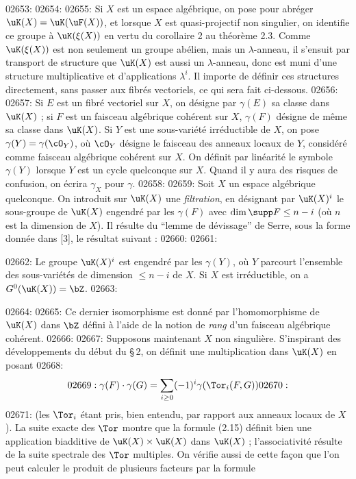 02653: %
02654: 
02655: Si $X$ est un espace alg\'ebrique, on pose pour abr\'eger $\uK(X) = \uK(\uF(X))$, et lorsque $X$ est quasi-projectif non singulier, on identifie ce groupe \`a $\uK(\xi(X))$ en vertu du corollaire 2 au th\'eor\`eme 2.3. Comme $\uK(\xi(X))$ est non seulement un groupe ab\'elien, mais un $\lambda$-anneau, il s'ensuit par transport de structure que $\uK(X)$ est aussi un $\lambda$-anneau, donc est muni d'une structure multiplicative et d'applications $\lambda^i$. Il importe de d\'efinir ces structures directement, sans passer aux fibr\'es vectoriels, ce qui sera fait ci-dessous.
02656: 
02657: Si $E$ est un fibr\'e vectoriel sur $X$, on d\'esigne par $\gamma(E)$ sa classe dans $\uK(X)$ ; si $F$ est un faisceau alg\'ebrique coh\'erent sur $X$, $\gamma(F)$ d\'esigne de m\^eme sa classe dans $\uK(X)$. Si $Y$ est une sous-vari\'et\'e irr\'eductible de $X$, on pose $\gamma(Y) = \gamma(\cO_Y)$, o\`u $\cO_Y$ d\'esigne le faisceau des anneaux locaux de $Y$, consid\'er\'e comme faisceau alg\'ebrique coh\'erent sur $X$. On d\'efinit par lin\'earit\'e le symbole $\gamma(Y)$ lorsque $Y$ est un cycle quelconque sur $X$. Quand il y aura des risques de confusion, on \'ecrira $\gamma_X$ pour $\gamma$.
02658: 
02659: Soit $X$ un espace alg\'ebrique quelconque. On introduit sur $\uK(X)$ une \emph{filtration}, en d\'esignant par $\uK(X)^i$ le sous-groupe de $\uK(X)$ engendr\'e par les $\gamma(F)$ avec $\dim \supp F \leq n - i$ (o\`u $n$ est la dimension de $X$). Il r\'esulte du ``lemme de d\'evissage'' de Serre, sous la forme donn\'ee dans [3], le r\'esultat suivant :
02660: 
02661: \begin{proposition}\label{prop:2.6}
02662: Le groupe $\uK(X)^i$ est engendr\'e par les $\gamma(Y)$, o\`u $Y$ parcourt l'ensemble des sous-vari\'et\'es de dimension $\leq n - i$ de $X$. Si $X$ est irr\'eductible, on a $G^0(\uK(X)) = \bZ$.
02663: \end{proposition}
02664: 
02665: Ce dernier isomorphisme est donn\'e par l'homomorphisme de $\uK(X)$ dans $\bZ$ d\'efini \`a l'aide de la notion de \emph{rang} d'un faisceau alg\'ebrique coh\'erent.
02666: 
02667: Supposons maintenant $X$ non singuli\`ere. S'inspirant des d\'eveloppements du d\'ebut du \S\,2, on d\'efinit une multiplication dans $\uK(X)$ en posant
02668: \begin{equation}\label{eq:2.15}
02669: \gamma(F) \cdot \gamma(G) = \sum_{i \geq 0} (-1)^i \gamma(\Tor_i(F,G))
02670: \end{equation}
02671: (les $\Tor_i$ \'etant pris, bien entendu, par rapport aux anneaux locaux de $X$). La suite exacte des $\Tor$ montre que la formule (2.15) d\'efinit bien une application biadditive de $\uK(X) \times \uK(X)$ dans $\uK(X)$ ; l'associativit\'e r\'esulte de la suite spectrale des $\Tor$ multiples. On v\'erifie aussi de cette fa\c{c}on que l'on peut calculer le produit de plusieurs facteurs par la formule

